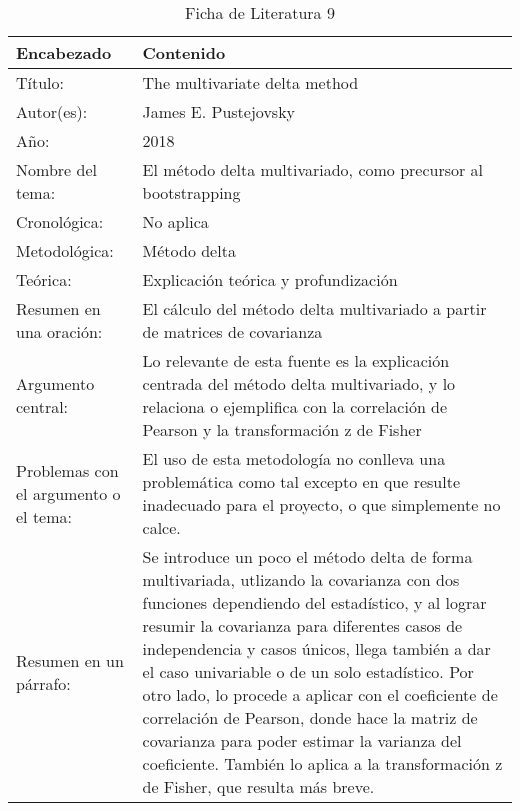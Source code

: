 \begin{table}[H]
    \caption{Ficha de Literatura 9}
    \begin{center}
        \begin{tabular}{  m{3cm} | m{12cm}  }
        \hline
        \textbf{ Encabezado} & \textbf{Contenido }\\ 
        \hline
        Título: & The multivariate delta method \\ 
        \hline
        Autor(es): & James E. Pustejovsky \\
        \hline
        Año: & 2018 \\ 
        \hline
        Nombre del tema: & El método delta multivariado, como precursor al bootstrapping \\ 
        \hline
        Cronológica: & No aplica  \\ 
        \hline
        Metodológica: & Método delta \\  
        \hline
        Teórica: & Explicación teórica y profundización \\ 
        \hline
        Resumen en una oración: & El cálculo del método delta multivariado a partir de matrices de covarianza \\ 
        \hline
        Argumento central: & Lo relevante de esta fuente es la explicación centrada del método delta multivariado, y lo relaciona o ejemplifica con la correlación de Pearson y la transformación z de Fisher    \\ 
        \hline
        Problemas con el argumento o el tema: & El uso de esta metodología no conlleva una problemática como tal excepto en que resulte inadecuado para el proyecto, o que simplemente no calce.  \\ 
        \hline
        Resumen en un párrafo: & Se introduce un poco el método delta de forma multivariada, utlizando la covarianza con dos funciones dependiendo del estadístico, y al lograr resumir la covarianza para diferentes casos de independencia y casos únicos, llega también a dar el caso univariable o de un solo estadístico. Por otro lado, lo procede a aplicar con el coeficiente de correlación de Pearson, donde hace la matriz de covarianza para poder estimar la varianza del coeficiente. También lo aplica a la transformación z de Fisher, que resulta más breve.  \\ 
        \hline
        \end{tabular}
    \end{center}
\end{table}

